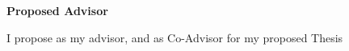 	\begin{center}
 	\LARGE \textbf{Proposed Advisor}
	 \end{center}

 \normalsize I propose \ADVISOR   as my advisor, and \COADVISOR  as Co-Advisor for my proposed Thesis
